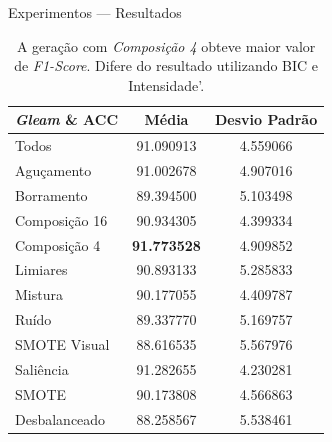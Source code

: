 \documentclass[10pt]{beamer}
\begin{document}
\begin{frame}{Experimentos --- Resultados}
  \setlength\leftmargini{1em}
  \begin{table}
    \begin{center}
      \caption{A geração com \textit{Composição 4} obteve maior valor de \textit{F1-Score}. Difere do resultado utilizando BIC e Intensidade'.}
      \footnotesize{
        \begin{tabular}{|l|c|c|}
          \hline
          \textbf{\emph{Gleam} \& ACC} & \textbf{Média}     & \textbf{Desvio Padrão} \\ \hline
          Todos                 & 91.090913          & 4.559066               \\ \hline
          Aguçamento            & 91.002678          & 4.907016               \\ \hline
          Borramento            & 89.394500          & 5.103498               \\ \hline
          Composição 16         & 90.934305          & 4.399334               \\ \hline
          Composição 4          & \textbf{91.773528} & 4.909852               \\ \hline
          Limiares              & 90.893133          & 5.285833               \\ \hline
          Mistura               & 90.177055          & 4.409787               \\ \hline
          Ruído                 & 89.337770          & 5.169757               \\ \hline
          SMOTE Visual          & 88.616535          & 5.567976               \\ \hline
          Saliência             & 91.282655          & 4.230281               \\ \hline
          SMOTE                 & 90.173808          & 4.566863               \\ \hline
          Desbalanceado         & 88.258567          & 5.538461               \\ \hline
        \end{tabular}
      }
    \end{center}
  \end{table}
\end{frame}
\begin{frame}{Experimentos --- Resultados}
  \setlength\leftmargini{1em}
  \begin{figure}
    \begin{center}
      }
    \end{center}
    \caption{\emph{Composição} de quatro imagens da classe \textit{Elephant}.}
  \end{figure}
\end{frame}
\end{document}
